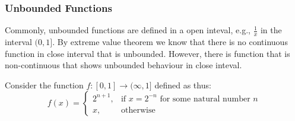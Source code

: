 \documentclass[../note.tex]{subfiles}
\begin{document}
\subsubsection{Unbounded Functions}
Commonly, unbounded functions are defined in a open inteval, e.g., $\frac{1}{x}$ in the interval $(0, 1]$. By extreme value theorem we know that there is no continuous function in close interval that is unbounded. However, there is function that is non-continuous that shows unbounded behaviour in close inteval.

Consider the function $f:[0,1] \rightarrow (\infty, 1]$ defined as thus:
		\[
    f(x)= 
\begin{cases}
	2^{n+1},& \text{if } x=2^{-n} \text{ for some natural number }n\\
    x,              & \text{otherwise}
\end{cases}
\]
\end{document}
